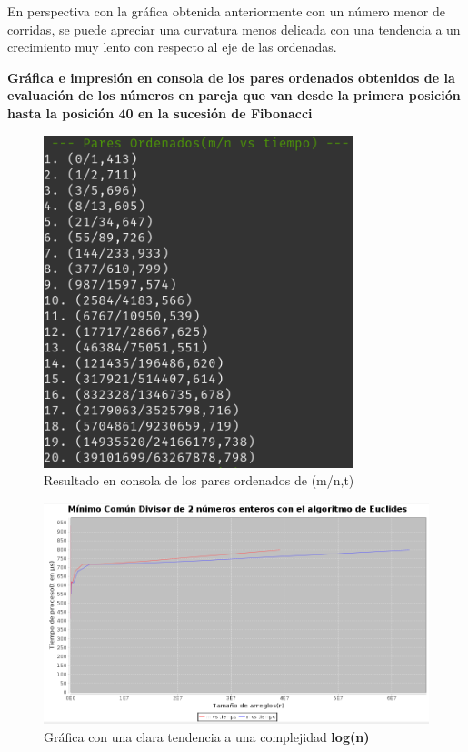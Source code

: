 \documentclass{report}
\begin{document}
\begin{center}
            En perspectiva con la gráfica obtenida anteriormente con un número menor de corridas, se puede apreciar una curvatura menos delicada con una tendencia a un crecimiento muy lento con respecto al eje de las ordenadas.
            
            
            \hfill \break
            \hfill \break
                
            \textbf{Gráfica e impresión en consola de los pares ordenados obtenidos de la evaluación de los números en pareja que van desde la primera posición hasta la posición 40 en la sucesión de Fibonacci}
                
            \begin{figure}[!h]
            	\centering
            	\includegraphics[width=9cm]{Imagenes/MCD-R-4.png}
                \caption{Resultado en consola de los pares ordenados de (m/n,t)}
            \end{figure}
            
            \begin{figure}[!h]
            	\centering
            	\includegraphics[width=15cm]{Imagenes/MCD-G-4.png}
                \caption{Gráfica con una clara tendencia a una complejidad \textbf{log(n)}}
            \end{figure}
            

\end{center}
\end{document}
